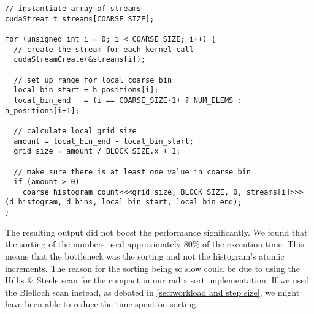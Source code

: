 \begin{lstlisting}[caption={Using streams to invoke kernels concurrently}, label={lst:coarse histo streams}]
// instantiate array of streams
cudaStream_t streams[COARSE_SIZE];

for (unsigned int i = 0; i < COARSE_SIZE; i++) {
  // create the stream for each kernel call
  cudaStreamCreate(&streams[i]);

  // set up range for local coarse bin
  local_bin_start = h_positions[i];
  local_bin_end   = (i == COARSE_SIZE-1) ? NUM_ELEMS : h_positions[i+1];

  // calculate local grid size
  amount = local_bin_end - local_bin_start;
  grid_size = amount / BLOCK_SIZE.x + 1;

  // make sure there is at least one value in coarse bin
  if (amount > 0)
    coarse_histogram_count<<<grid_size, BLOCK_SIZE, 0, streams[i]>>>(d_histogram, d_bins, local_bin_start, local_bin_end);
}
\end{lstlisting}

The resulting output did not boost the performance significantly.
We found that the sorting of the numbers used approximately $80\%$ of the execution time.
This means that the bottleneck was the sorting and not the histogram's atomic increments.
The reason for the sorting being so slow could be due to using the Hillis \& Steele scan for the compact in our radix sort implementation.
If we used the Blelloch scan instead, as debated in \cref{sec:workload and step size}, we might have been able to reduce the time spent on sorting.
